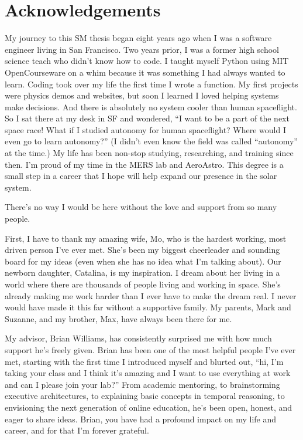 \documentclass[12pt,vi,leftblank,twoside]{mitthesis}
\begin{document}
\cleardoublepage

\section*{Acknowledgements}

My journey to this SM thesis began eight years ago when I was a software engineer living in San
Francisco. Two years prior, I was a former high school science teach who didn't know how to code. I
taught myself Python using MIT OpenCourseware on a whim because it was something I had always wanted
to learn. Coding took over my life the first time I wrote a function. My first projects were physics
demos and websites, but soon I learned I loved helping systems make decisions. And there is
absolutely no system cooler than human spaceflight. So I sat there at my desk in SF and wondered, ``I
want to be a part of the next space race! What if I studied autonomy for human spaceflight? Where
would I even go to learn autonomy?'' (I didn't even know the field was called ``autonomy'' at the
time.) My life has been non-stop studying, researching, and training since then. I'm proud of my
time in the MERS lab and AeroAstro. This degree is a small step in a career that I hope will help
expand our presence in the solar system.

There's no way I would be here without the love and support from so many people.

First, I have to thank my amazing wife, Mo, who is the hardest working, most driven person I've ever
met. She's been my biggest cheerleader and sounding board for my ideas (even when she has no idea
what I'm talking about). Our newborn daughter, Catalina, is my inspiration. I dream about her living
in a world where there are thousands of people living and working in space. She's already making me
work harder than I ever have to make the dream real. I never would have made it this far without a
supportive family. My parents, Mark and Suzanne, and my brother, Max, have always been there for me.

My advisor, Brian Williams, has consistently surprised me with how much support he's freely given.
Brian has been one of the most helpful people I've ever met, starting with the first time I
introduced myself and blurted out, ``hi, I'm taking your class and I think it's amazing and I want to
use everything at work and can I please join your lab?'' From academic mentoring, to brainstorming
executive architectures, to explaining basic concepts in temporal reasoning, to envisioning the next
generation of online education, he's been open, honest, and eager to share ideas. Brian, you have
had a profound impact on my life and career, and for that I'm forever grateful.
\end{document}
